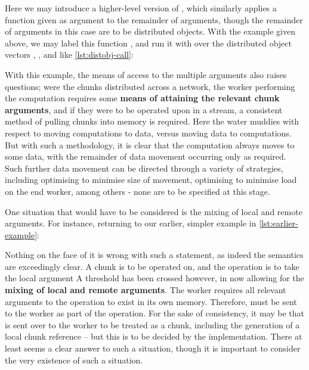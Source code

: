 
Here we may introduce a higher-level version of , which similarly applies a function given as argument to the remainder of arguments, though the remainder of arguments in this case are to be distributed objects.
With the example given above, we may label this function , and run it with  over the distributed object vectors , , and  like \cref{lst:distobj-call}:


With this example, the means of access to the multiple arguments also raises questions; were the chunks distributed across a network, the worker performing the computation requires some \textbf{means of attaining the relevant chunk arguments}, and if they were to be operated upon in a stream, a consistent method of pulling chunks into memory is required.
Here the water muddies with respect to moving computations to data, versus moving data to computations.
But with such a methodology, it is clear that the computation always moves to some data, with the remainder of data movement occurring only as required.
Such further data movement can be directed through a variety of strategies, including optimising to minimise size of movement, optimising to minimise load on the end worker, among others - none are to be specified at this stage.

One situation that would have to be considered is the mixing of local and remote arguments.
For instance, returning to our earlier, simpler example in \cref{lst:earlier-example}:


Nothing on the face of it is wrong with such a statement, as indeed the semantics are exceedingly clear.
A chunk is to be operated on, and the operation is to take the local argument  A threshold has been crossed however, in now allowing for the \textbf{mixing of local and remote arguments}.
The worker requires all relevant arguments to the operation to exist in its own memory.
Therefore,  must be sent to the worker as part of the operation.
For the sake of consistency, it may be that  is sent over to the worker to be treated as a chunk, including the generation of a local chunk reference -- but this is to be decided by the implementation.
There at least seems a clear answer to such a situation, though it is important to consider the very existence of such a situation.

